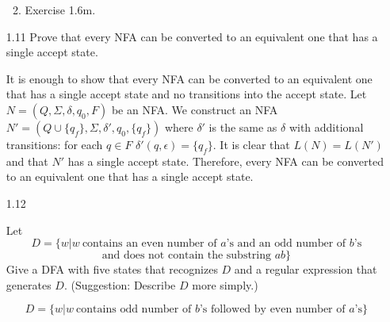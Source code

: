 \begin{enumerate}
\begin{enumerate}
\begin{figure}[H]
                    \end{figure}
              \item Exercise 1.6m.
                    \begin{figure}[H]
                        \centering
                    \end{figure}
          \end{enumerate}
          
    \item [1.11]
          Prove that every NFA can be converted to an equivalent one that has a single accept state.
          
          It is enough to show that every NFA can be converted to an equivalent one that has a single accept state and no transitions into the accept state. Let $N = (Q, \Sigma, \delta, q_0, F)$ be an NFA. We construct an NFA $N' = (Q \cup \{q_f\}, \Sigma, \delta', q_0, \{q_f\})$ where $\delta'$ is the same as $\delta$ with additional transitions: for each $q \in F$ $\delta'(q, \epsilon) = \{q_f\}$. It is clear that $L(N) = L(N')$ and that $N'$ has a single accept state. Therefore, every NFA can be converted to an equivalent one that has a single accept state.
          
    \item [1.12]
          
          Let \[D = \{w|w~ \text{contains an even number of }a\text{’s and an odd number of }b\text{’s}\]
          \[ \text{and does not contain the substring }ab\}\] Give a DFA with five states that recognizes $D$ and a regular expression that generates $D$. (Suggestion: Describe $D$ more simply.)
          
          $$D = \{w|w~ \text{contains odd number of }b\text{'s followed by even number of }a\text{'s} \}$$
          

\end{enumerate}
